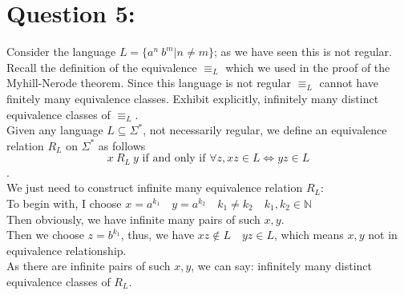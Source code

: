 \documentclass [9 pt]{article}
\theoremstyle{definition}
\begin{document}
\newpage
\section*{Question 5:}
Consider the language $L = \{a^n\ b^m|n  \neq m\}$; as we have seen this is not regular. Recall the definition of the equivalence $\equiv_L$ which we used in the proof of the Myhill-Nerode theorem. Since this language is not regular $\equiv_L$ cannot have finitely many equivalence classes. Exhibit explicitly, infinitely many distinct equivalence classes of $\equiv_L$.\\
\newline
\newline
Given any language $L \subseteq \Sigma^*$, not necessarily regular, we define an equivalence relation $R_L$ on $\Sigma^*$ as follows
$$x\ R_L\ y \text{ if and only if } \forall z, xz \in L \Leftrightarrow yz \in L$$.
\\ \newline
We just need to construct infinite many equivalence relation $R_L$:\\
To begin with, I choose $x = a^{k_1} \quad y = a^{k_2} \quad k_1 \neq k_2 \quad k_1, k_2 \in \mathbb{N}$\\
Then obviously, we have infinite many pairs of such $x, y$.\\
Then we choose $z = b^{k_1}$, thus, we have $xz \notin L \quad yz \in L$, which means $x, y$ not in equivalence relationship.\\
As there are infinite pairs of such $x, y$, we can say: infinitely many distinct equivalence classes of $R_L$.\\
\end{document}
